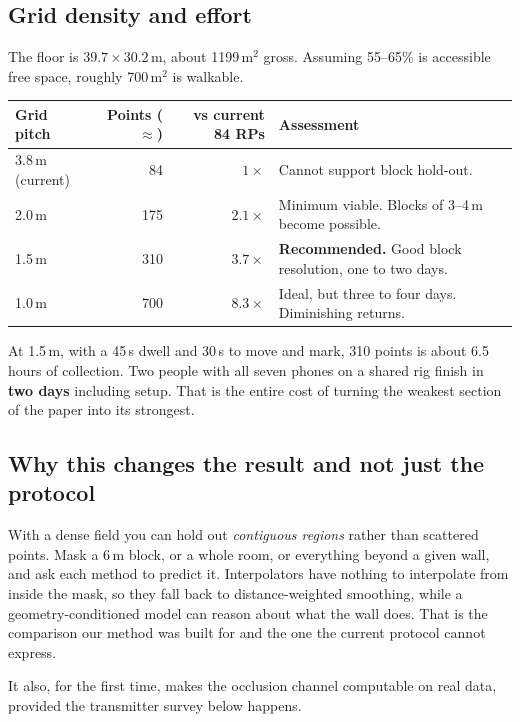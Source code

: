 \documentclass[10pt,a4paper]{article}
\newcommand{\G}[1]{\textcolor{good}{\textbf{#1}}}
\begin{document}
\subsection{Grid density and effort}

The floor is $39.7\times30.2$\,m, about 1199\,m$^2$ gross. Assuming 55--65\% is
accessible free space, roughly 700\,m$^2$ is walkable.

\begin{center}\small
\begin{tabular}{@{}lrrl@{}}
\toprule
Grid pitch & Points ($\approx$) & vs current 84 RPs & Assessment \\ \midrule
3.8\,m (current) & 84 & $1\times$ & Cannot support block hold-out. \\
2.0\,m & 175 & $2.1\times$ & Minimum viable. Blocks of 3--4\,m become possible. \\
\rowcolor{green!8}1.5\,m & 310 & $3.7\times$ & \G{Recommended.} Good block resolution, one to two days. \\
1.0\,m & 700 & $8.3\times$ & Ideal, but three to four days. Diminishing returns. \\
\bottomrule
\end{tabular}
\end{center}

At 1.5\,m, with a 45\,s dwell and 30\,s to move and mark, 310 points is about 6.5 hours
of collection. Two people with all seven phones on a shared rig finish in \G{two days}
including setup. That is the entire cost of turning the weakest section of the paper into
its strongest.

\subsection{Why this changes the result and not just the protocol}

With a dense field you can hold out \emph{contiguous regions} rather than scattered
points. Mask a 6\,m block, or a whole room, or everything beyond a given wall, and ask
each method to predict it. Interpolators have nothing to interpolate from inside the
mask, so they fall back to distance-weighted smoothing, while a geometry-conditioned
model can reason about what the wall does. That is the comparison our method was built
for and the one the current protocol cannot express.

It also, for the first time, makes the occlusion channel computable on real data, provided
the transmitter survey below happens.
\end{document}
